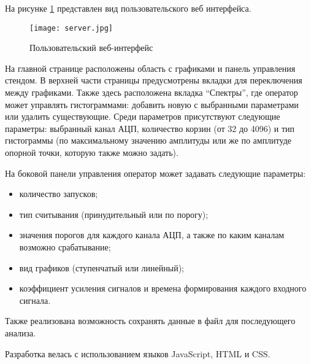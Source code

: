 На рисунке \ref{fig:server} представлен вид пользовательского веб интерфейса.\par
\begin{figure}[ht]
    \centering
    \texttt{[image: server.jpg]}
    \caption{Пользовательский веб-интерфейс}
    \label{fig:server}
\end{figure}
На главной странице расположены область с графиками и панель управления стендом. В верхней части страницы предусмотрены вкладки для переключения между графиками. Также здесь расположена вкладка ``Спектры'', где оператор может управлять гистограммами: добавить новую с выбранными параметрами или удалить существующие. Среди параметров присутствуют следующие параметры: выбранный канал АЦП, количество корзин (от 32 до 4096) и тип гистограммы (по максимальному значению амплитуды или же по амплитуде опорной точки, которую также можно задать).\par
На боковой панели управления оператор может задавать следующие параметры:\par
\begin{itemize}
    \item количество запусков;
    \item тип считывания (принудительный или по порогу);
    \item значения порогов для каждого канала АЦП, а также по каким каналам возможно срабатывание;
    \item вид графиков (ступенчатый или линейный);
    \item коэффициент усиления сигналов и времена формирования каждого входного сигнала.
\end{itemize}\par
Также реализована возможность сохранять данные в файл для последующего анализа.\par
Разработка велась с использованием языков JavaScript, HTML и CSS. \par
